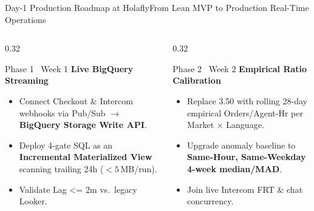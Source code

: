 \documentclass[aspectratio=169,8pt]{beamer}
\newcommand{\code}[1]{{\fontfamily{pcr}\selectfont\fontsize{6.5}{8.0}\selectfont\color{ink}#1}}
\begin{document}
\begin{frame}[t]{Day-1 Production Roadmap at Holafly}{From Lean MVP to Production Real-Time Operations}
\vspace{2pt}
\begin{columns}[T,onlytextwidth]
  \begin{column}{0.32\textwidth}
    \begin{hfcard}{Phase 1 \textperiodcentered\ Week 1}
      \textbf{\color{ink}\fontsize{7.5}{9}\selectfont Live BigQuery Streaming}\\[2pt]
      {\fontsize{6.6}{8.4}\selectfont
      \begin{itemize}\setlength\itemsep{2.5pt}
        \item Connect Checkout \& Intercom webhooks via Pub/Sub $\rightarrow$ \textbf{BigQuery Storage Write API}.
        \item Deploy 4-gate SQL as an \textbf{Incremental Materialized View} scanning trailing 24h ($<5$\,MB/run).
        \item Validate \code{Lag <= 2m} vs.\ legacy Looker.
      \end{itemize}
      }
    \end{hfcard}
  \end{column}

  \begin{column}{0.32\textwidth}
    \begin{hfcard}{Phase 2 \textperiodcentered\ Week 2}
      \textbf{\color{ink}\fontsize{7.5}{9}\selectfont Empirical Ratio Calibration}\\[2pt]
      {\fontsize{6.6}{8.4}\selectfont
      \begin{itemize}\setlength\itemsep{2.5pt}
        \item Replace \code{3.50} with rolling 28-day empirical \code{Orders/Agent-Hr} per \code{Market $\times$ Language}.
        \item Upgrade anomaly baseline to \textbf{Same-Hour, Same-Weekday 4-week median/MAD}.
        \item Join live Intercom FRT \& chat concurrency.
      \end{itemize}
      }
    \end{hfcard}
  \end{column}


\end{columns}
\end{frame}
\end{document}
